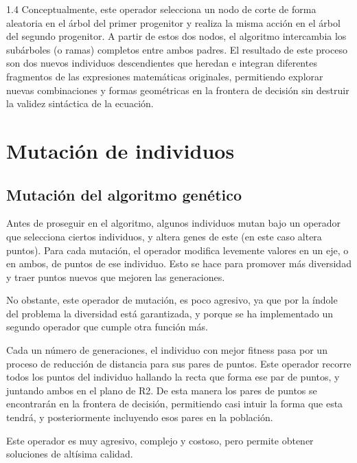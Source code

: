 \documentclass{article}
\begin{document}
\begin{spacing}{1.4}
Conceptualmente, este operador selecciona un nodo de corte de forma aleatoria en el árbol del primer progenitor y realiza la misma acción en el árbol del segundo progenitor. A partir de estos dos nodos, el algoritmo intercambia los subárboles (o ramas) completos entre ambos padres. El resultado de este proceso son dos nuevos individuos descendientes que heredan e integran diferentes fragmentos de las expresiones matemáticas originales, permitiendo explorar nuevas combinaciones y formas geométricas en la frontera de decisión sin destruir la validez sintáctica de la ecuación.
\section{Mutación de individuos}
\subsection{Mutación del algoritmo genético}

Antes de proseguir en el algoritmo, algunos individuos mutan bajo un operador
que selecciona ciertos individuos, y altera genes de este (en este caso altera puntos). Para cada mutación,
el operador modifica levemente valores en un eje, o en ambos, de puntos de ese individuo. Esto se hace para promover más
diversidad y traer puntos nuevos que mejoren las generaciones.

No obstante, este operador de mutación, es poco agresivo, ya que por la índole del problema
la diversidad está garantizada, y porque se ha implementado un segundo operador que cumple otra función más.

Cada un número de generaciones, el individuo con mejor fitness pasa por un proceso de
reducción de distancia para sus pares de puntos. Este operador recorre todos los puntos del individuo
hallando la recta que forma ese par de puntos, y juntando ambos en el plano de R2. De esta manera
los pares de puntos se encontrarán en la frontera de decisión, permitiendo casi intuir la forma que esta tendrá,
y posteriormente incluyendo esos pares en la población.

Este operador es muy agresivo, complejo y costoso, pero permite obtener soluciones de altísima calidad.


\end{spacing}
\end{document}
